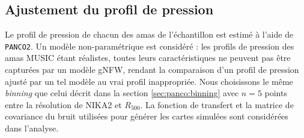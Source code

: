 \subsection{Ajustement du profil de pression} \label{sec:music_pressure}

Le profil de pression de chacun des amas de l'échantillon est estimé à l'aide de \texttt{PANCO2}.
Un modèle non-paramétrique est considéré : les profils de pression des amas MUSIC étant réalistes, toutes leurs caractéristiques ne peuvent pas être capturées par un modèle gNFW, rendant la comparaison d'un profil de pression ajusté par un tel modèle au vrai profil inappropriée.
Nous choisissons le même \textit{binning} que celui décrit dans la section \ref{sec:panco:binning} avec $n=5$ points entre la résolution de NIKA2 et $R_{500}$.
La fonction de transfert et la matrice de covariance du bruit utilisées pour générer les cartes simulées sont considérées dans l'analyse.

